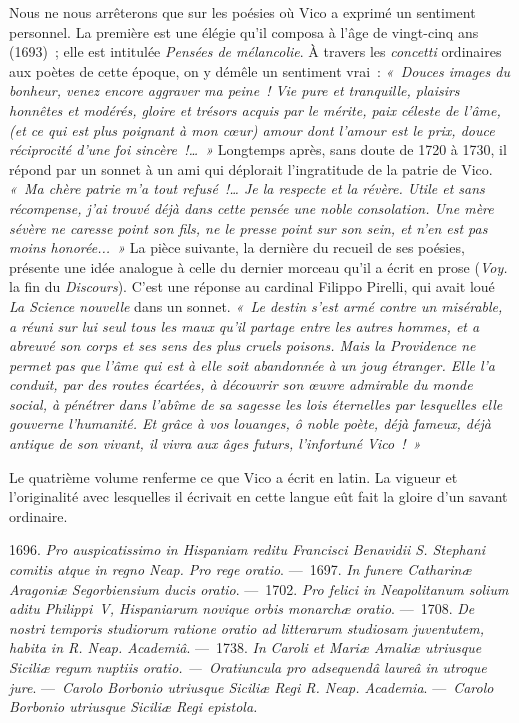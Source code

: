 \documentclass[french,twoside]{book} %
\begin{document}
Nous ne nous arrêterons que sur les poésies où Vico a exprimé un sentiment personnel. La première est une élégie qu’il composa à l’âge de vingt-cinq ans (1693) ; elle est intitulée {\itshape Pensées de mélancolie}. À travers les {\itshape concetti} ordinaires aux poètes de cette époque, on y démêle un sentiment vrai : \emph{« Douces images du bonheur, venez encore aggraver ma peine ! Vie pure et tranquille, plaisirs honnêtes et modérés, gloire et trésors acquis  par le mérite, paix céleste de l’âme, (et ce qui est plus poignant à mon cœur) amour dont l’amour est le prix, douce réciprocité d’une foi sincère !… »} Longtemps après, sans doute de 1720 à 1730, il répond par un sonnet à un ami qui déplorait l’ingratitude de la patrie de Vico. \emph{« Ma chère patrie m’a tout refusé !… Je la respecte et la révère. Utile et sans récompense, j’ai trouvé déjà dans cette pensée une noble consolation. Une mère sévère ne caresse point son fils, ne le presse point sur son sein, et n’en est pas moins honorée... »} La pièce suivante, la dernière du recueil de ses poésies, présente une idée analogue à celle du dernier morceau qu’il a écrit en prose ({\itshape Voy.} la fin du {\itshape Discours}). C’est une réponse au cardinal Filippo Pirelli, qui avait loué {\itshape La Science nouvelle} dans un sonnet. \emph{« Le destin s’est armé contre un misérable, a réuni sur lui seul tous les maux qu’il partage entre les autres hommes, et a abreuvé son corps et ses sens des plus cruels poisons. Mais la Providence ne permet pas que l’âme qui est à elle soit abandonnée à un joug étranger. Elle l’a conduit, par des routes écartées, à découvrir son œuvre admirable du monde social, à pénétrer dans l’abîme de sa sagesse les lois éternelles par lesquelles elle gouverne l’humanité. Et grâce à vos louanges, ô noble poète, déjà fameux, déjà antique de son vivant, il vivra aux âges futurs, l’infortuné Vico ! »}\par
\par
Le quatrième volume renferme ce que Vico a écrit en latin. La vigueur et l’originalité avec lesquelles il écrivait en cette langue eût fait la gloire d’un savant ordinaire.\par
1696. {\itshape Pro auspicatissimo in Hispaniam reditu Francisci Benavidii S. Stephani comitis atque in regno Neap. Pro rege oratio}. — 1697. {\itshape In funere Catharinæ Aragoniæ Segorbiensium ducis oratio}. — 1702. {\itshape Pro felici in Neapolitanum solium aditu Philippi V, Hispaniarum novique orbis monarchæ oratio}. — 1708. {\itshape De nostri temporis studiorum ratione oratio ad litterarum studiosam juventutem, habita in R. Neap. Academiâ}. — 1738. {\itshape In}  {\itshape Caroli et Mariæ Amaliæ utriusque Siciliæ regum nuptiis oratio. — Oratiuncula pro adsequendâ laureâ in utroque jure}. — {\itshape Carolo Borbonio utriusque Siciliæ Regi R. Neap. Academia}. — {\itshape Carolo Borbonio utriusque Siciliæ Regi epistola.}\par
\end{document}
